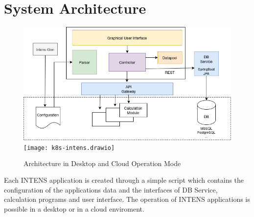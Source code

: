 \newpage
\section{System Architecture}
\begin{figure}[h]\label{fig:architecture}
\includegraphics[width=0.52\linewidth]{intens-arch.drawio}
\hfill
\texttt{[image: k8s-intens.drawio]}
  \caption{Architecture in Desktop and Cloud Operation Mode}
\end{figure}
 
\vspace {0.1cm}

Each INTENS application is created through a simple script which contains
the configuration of the applications data and the interfaces
of DB Service, calculation programs and user interface. The operation
of INTENS applications is possible in a desktop or in a cloud enviroment.

